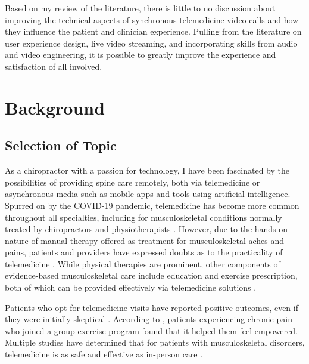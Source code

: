 \documentclass[utf8]{FrontiersinHarvard} %
\begin{document}
Based on my review of the literature, there is little to no discussion about improving the technical aspects of synchronous telemedicine video calls and how they influence the patient and clinician experience. Pulling from the literature on user experience design, live video streaming, and incorporating skills from audio and video engineering, it is possible to greatly improve the experience and satisfaction of all involved.

\section{Background}

\subsection{Selection of Topic}

As a chiropractor with a passion for technology, I have been fascinated by the possibilities of providing spine care remotely, both via telemedicine or asynchronous media such as mobile apps and tools using artificial intelligence. Spurred on by the COVID-19 pandemic, telemedicine has become more common throughout all specialties, including for musculoskeletal conditions normally treated by chiropractors and physiotherapists \citep{lamplotGoodComesEvil2021}. However, due to the hands-on nature of manual therapy offered as treatment for musculoskeletal aches and pains, patients and providers have expressed doubts as to the practicality of telemedicine \citep{Barton2022It}. While physical therapies are prominent, other components of evidence-based musculoskeletal care include education and exercise prescription, both of which can be provided effectively via telemedicine solutions \citep{baroniStateArtTelerehabilitation2023}.

Patients who opt for telemedicine visits have reported positive outcomes, even if they were initially skeptical \citep{Hinman2024Telerehabilitation, Lawford2018I}. According to \citet{ernstzenYouMustUnderstand2022}, patients experiencing chronic pain who joined a group exercise program found that it helped them feel empowered. Multiple studies have determined that for patients with musculoskeletal disorders, telemedicine is as safe and effective as in-person care \citep{Bargeri2024Effectiveness, Seron2021Effectiveness, withersRemotelyDeliveredPhysiotherapy2024}.
\end{document}
